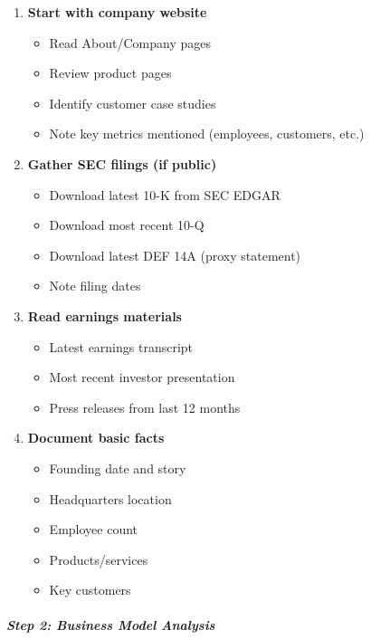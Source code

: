 \documentclass[11pt]{article}
\begin{document}
\begin{enumerate}[leftmargin=*,itemsep=2pt,topsep=2pt]
\item {} \textbf{Start with company website}
\begin{itemize}[leftmargin=*,itemsep=2pt,topsep=2pt]
\item {} Read About/Company pages
\item {} Review product pages
\item {} Identify customer case studies
\item {} Note key metrics mentioned (employees, customers, etc.)
\end{itemize}
\item {} \textbf{Gather SEC filings (if public)}
\begin{itemize}[leftmargin=*,itemsep=2pt,topsep=2pt]
\item {} Download latest 10-K from SEC EDGAR
\item {} Download most recent 10-Q
\item {} Download latest DEF 14A (proxy statement)
\item {} Note filing dates
\end{itemize}
\item {} \textbf{Read earnings materials}
\begin{itemize}[leftmargin=*,itemsep=2pt,topsep=2pt]
\item {} Latest earnings transcript
\item {} Most recent investor presentation
\item {} Press releases from last 12 months
\end{itemize}
\item {} \textbf{Document basic facts}
\begin{itemize}[leftmargin=*,itemsep=2pt,topsep=2pt]
\item {} Founding date and story
\item {} Headquarters location
\item {} Employee count
\item {} Products/services
\item {} Key customers
\end{itemize}
\end{enumerate}

\subparagraph{Step 2: Business Model Analysis}\mbox{}\par
\end{document}
